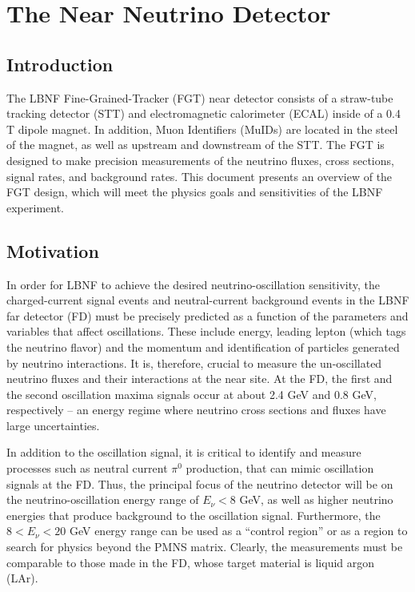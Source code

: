 
\chapter{The Near Neutrino Detector}

\section{Introduction} 


The LBNF Fine-Grained-Tracker (FGT) near detector consists of a straw-tube
tracking detector (STT) and electromagnetic calorimeter (ECAL) inside of a 0.4 T
dipole magnet. In addition, Muon Identifiers (MuIDs) are located in the
steel of the magnet, as well as upstream and downstream of the STT. The FGT
is designed to make precision measurements of the neutrino fluxes, 
cross sections, signal rates, and background rates. 
This document presents an overview of the FGT design, which 
will meet the physics goals and sensitivities of the LBNF experiment. 

\section{Motivation}

In order for LBNF to achieve the desired neutrino-oscillation sensitivity, the 
charged-current signal events
and neutral-current
background events in the LBNF far detector (FD) must be precisely 
predicted as a function of the parameters and variables that affect 
oscillations. These include energy, leading lepton (which tags the neutrino flavor) and the 
momentum and identification of particles generated by neutrino interactions. 
It is, therefore, crucial to measure the un-oscillated neutrino fluxes and 
their interactions at the near site. At the FD, the first and the second 
oscillation maxima signals occur at about 2.4 GeV and 0.8 GeV, respectively 
-- an energy regime where neutrino cross sections and fluxes have large 
uncertainties. 

In addition to the oscillation signal, it is 
critical to identify and measure processes such as neutral current $\pi^0$ production,
that can mimic oscillation signals 
at the FD. Thus, the principal focus of the neutrino detector will be 
on the neutrino-oscillation energy range of $E_\nu < 8$ GeV, as well as higher 
neutrino energies that produce background to the oscillation signal. Furthermore, the
$8<E_\nu < 20$ GeV energy range can be used as a ``control region'' or
as a region
to search for physics beyond the PMNS matrix. Clearly, 
the measurements must be 
comparable to those made in the FD, whose target material is liquid argon (LAr). 

